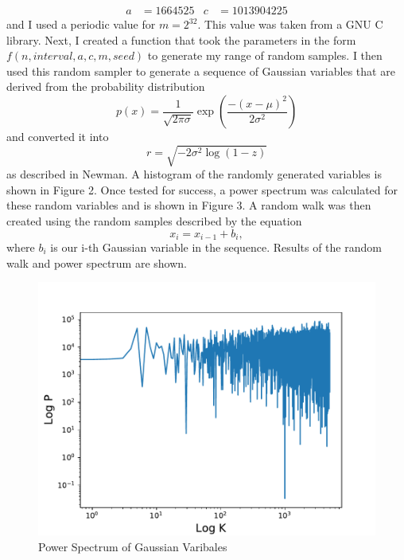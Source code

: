 \documentclass{article}
\begin{document}
\begin{enumerate}
{    \begin{align*}
        a &= 1664525 & c &= 1013904225
    \end{align*}
    and I used a periodic value for $m = 2^{32}$. This value was taken from a GNU C library. Next, I created a function that took the parameters in the form $f(n,interval, a, c,m, seed)$ to generate my range of random samples. I then used this random sampler to generate a sequence of Gaussian variables that are derived from the probability distribution
    \begin{equation}
        p(x) = \frac{1}{\sqrt{2\pi \sigma}}\exp\left(\frac{-(x-\mu)^2}{2\sigma^2} \right)
    \end{equation}
    and converted it into
    \begin{equation*}
        r = \sqrt{-2\sigma^2\log(1-z)}
    \end{equation*}
    as described in Newman. A histogram of the randomly generated variables is shown in Figure 2. Once tested for success,
    a power spectrum was calculated for these random variables and is shown in Figure 3. A random walk was then created using the random samples described by the equation
    \begin{equation*}
        x_i = x_{i-1} + b_i,
    \end{equation*}
    where $b_i$ is our i-th Gaussian variable in the sequence. Results of the random walk and power spectrum are shown.
    \begin{figure}
        \centering
        \includegraphics{power_spec.pdf}
        \caption{Power Spectrum of Gaussian Varibales}
        \label{fig:my_label}

\end{figure}}
\end{enumerate}
\end{document}
